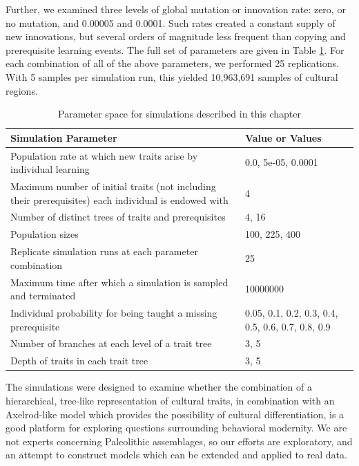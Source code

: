 \documentclass[graybox,natbib]{svmult}
\begin{document}
Further, we examined three levels of global mutation or innovation rate:
zero, or no mutation, and 0.00005 and 0.0001. Such rates created a
constant supply of new innovations, but several orders of magnitude less
frequent than copying and prerequisite learning events. The full set of
parameters are given in Table \ref{tab:axelrodct-sim-parameters}. For
each combination of all of the above parameters, we performed 25
replications. With 5 samples per simulation run, this yielded 10,963,691
samples of cultural regions.

\begin{table}[H]
\begin{tabular}{|p{}|p{}|}
\hline
\textbf{Simulation Parameter} & \textbf{Value or Values} \\ 
\hline
Population rate at which new traits arise by individual learning & 0.0, 5e-05, 0.0001\\ 
 \hline 
Maximum number of initial traits (not including their prerequisites) each individual is endowed with & 4\\ 
 \hline 
Number of distinct trees of traits and prerequisites & 4, 16\\ 
 \hline 
Population sizes & 100, 225, 400\\ 
 \hline 
Replicate simulation runs at each parameter combination & 25\\ 
 \hline 
Maximum time after which a simulation is sampled and terminated & 10000000\\ 
 \hline 
Individual probability for being taught a missing prerequisite & 0.05, 0.1, 0.2, 0.3, 0.4, 0.5, 0.6, 0.7, 0.8, 0.9\\ 
 \hline 
Number of branches at each level of a trait tree & 3, 5\\ 
 \hline 
Depth of traits in each trait tree & 3, 5\\ 
 \hline 
\hline
\end{tabular}
\caption{Parameter space for simulations described in this chapter}
\label{tab:axelrodct-sim-parameters}
\end{table}

The simulations were designed to examine whether the combination of a
hierarchical, tree-like representation of cultural traits, in
combination with an Axelrod-like model which provides the possibility of
cultural differentiation, is a good platform for exploring questions
surrounding behavioral modernity. We are not experts concerning
Paleolithic assemblages, so our efforts are exploratory, and an attempt
to construct models which can be extended and applied to real data.
\end{document}
